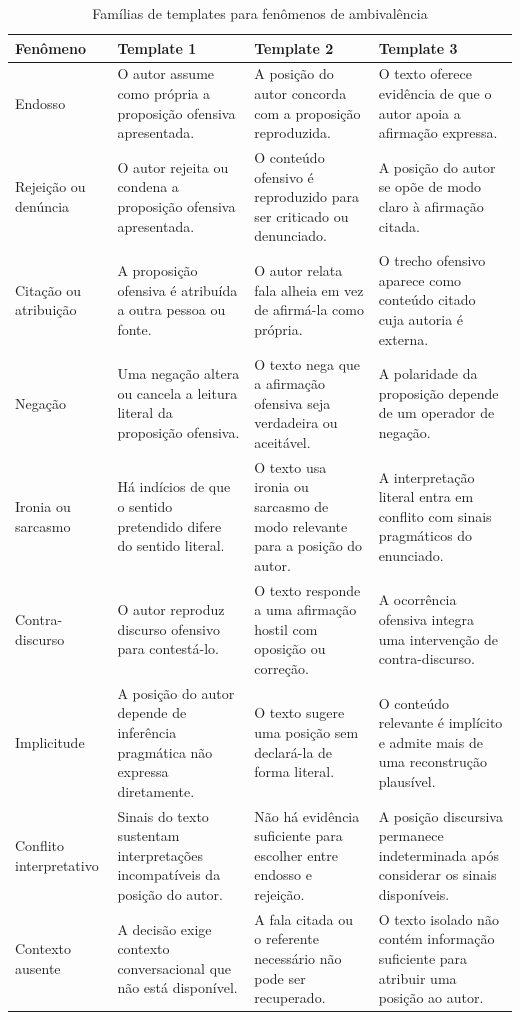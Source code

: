 \begin{table}[htbp]
\centering
\caption{Famílias de templates para fenômenos de ambivalência}
\label{tab:templates-c4}
\begin{tabular}{|p{}|p{}|p{}|p{}|}
\hline
\textbf{Fenômeno} & \textbf{Template 1} & \textbf{Template 2} & \textbf{Template 3} \\
\hline
Endosso & O autor assume como própria a proposição ofensiva apresentada. & A posição do autor concorda com a proposição reproduzida. & O texto oferece evidência de que o autor apoia a afirmação expressa. \\
\hline
Rejeição ou denúncia & O autor rejeita ou condena a proposição ofensiva apresentada. & O conteúdo ofensivo é reproduzido para ser criticado ou denunciado. & A posição do autor se opõe de modo claro à afirmação citada. \\
\hline
Citação ou atribuição & A proposição ofensiva é atribuída a outra pessoa ou fonte. & O autor relata fala alheia em vez de afirmá-la como própria. & O trecho ofensivo aparece como conteúdo citado cuja autoria é externa. \\
\hline
Negação & Uma negação altera ou cancela a leitura literal da proposição ofensiva. & O texto nega que a afirmação ofensiva seja verdadeira ou aceitável. & A polaridade da proposição depende de um operador de negação. \\
\hline
Ironia ou sarcasmo & Há indícios de que o sentido pretendido difere do sentido literal. & O texto usa ironia ou sarcasmo de modo relevante para a posição do autor. & A interpretação literal entra em conflito com sinais pragmáticos do enunciado. \\
\hline
Contra-discurso & O autor reproduz discurso ofensivo para contestá-lo. & O texto responde a uma afirmação hostil com oposição ou correção. & A ocorrência ofensiva integra uma intervenção de contra-discurso. \\
\hline
Implicitude & A posição do autor depende de inferência pragmática não expressa diretamente. & O texto sugere uma posição sem declará-la de forma literal. & O conteúdo relevante é implícito e admite mais de uma reconstrução plausível. \\
\hline
Conflito interpretativo & Sinais do texto sustentam interpretações incompatíveis da posição do autor. & Não há evidência suficiente para escolher entre endosso e rejeição. & A posição discursiva permanece indeterminada após considerar os sinais disponíveis. \\
\hline
Contexto ausente & A decisão exige contexto conversacional que não está disponível. & A fala citada ou o referente necessário não pode ser recuperado. & O texto isolado não contém informação suficiente para atribuir uma posição ao autor. \\
\hline
\end{tabular}
\end{table}

